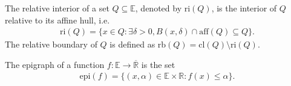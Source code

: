 \documentclass{tufte-handout}
\makeatletter
\renewcommand{\subsection}{\@startsection{subsection}%
    {3}{-1.8em}{-3ex \@plus -1ex \@minus -.2ex}%
    {1.5ex \@plus .2ex}
    {\hspace*{-5.5em}\fcolorbox{ltblue}{ltblue}{\parbox[c][1.0ex][b]{4em}{\phantom{space}}}
    \normalfont\large\itshape\color{ltblue}}}
\makeatother
\begin{document}
\begin{Definition}
    The relative interior of a set \( Q \subseteq \mathbb{E} \),
    denoted by \( \text{ri}(Q) \), is the interior of \( Q \) relative to its affine hull, i.e.
    \begin{align}
    \text{ri}(Q) = \{ x \in Q : \exists \delta > 0, B(x, \delta) \cap \text{aff}(Q) \subseteq Q \}.
    \end{align}
    The relative boundary of \( Q \) is defined as \( \text{rb}(Q) = \text{cl}(Q) \setminus \text{ri}(Q) \).
\end{Definition}

\begin{Definition}[Epigraph]
    The epigraph of a function \( f:\mathbb{E}\to \overline{\mathbb{R}} \) is the set
    \begin{align}
    \text{epi}(f) = \{ (x, \alpha) \in \mathbb{E} \times \mathbb{R} : f(x) \leq \alpha \}.
    \end{align}
\end{Definition}
\end{document}
